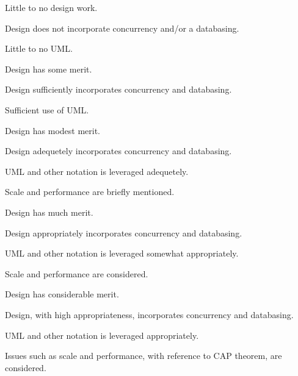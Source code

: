 \documentclass{../../../fal_assignment}
\begin{document}
\rubricyeartwo
\begin{markingrubric}
%
%
        \grade\fail 	Little to no design work.
            \par 		Design does not incorporate concurrency and/or a databasing.
          \par 		Little to no UML.
          
        \grade 		Design has some merit.
            \par 		Design sufficiently incorporates concurrency and databasing. 
          \par 		Sufficient use of UML.
          
        \grade 		Design has modest merit.
            \par 		Design adequetely incorporates concurrency and databasing.  
          \par 		UML and other notation is leveraged adequetely.
            \par 		Scale and performance are briefly mentioned.
            
        \grade 		Design has much merit.
            \par 		Design appropriately incorporates concurrency and databasing.  
          \par 		UML and other notation is leveraged somewhat appropriately.
            \par 		Scale and performance are considered.
            
        \grade 		Design has considerable merit.
            \par 		Design, with high appropriateness, incorporates concurrency and databasing.  
          \par 		UML and other notation is leveraged appropriately.
            \par 		Issues such as scale and performance, with reference to CAP theorem, are considered.
            

\end{markingrubric}
\end{document}
